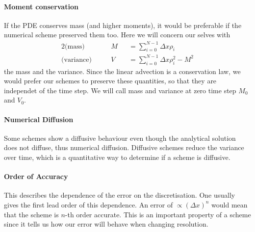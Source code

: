\paragraph{Moment conservation}
If the PDE conserves mass (and higher moments), it would be preferable if the numerical scheme preserved them too. Here we will concern our selves with 
\begin{alignat}{2}
\text{(mass)}& \qquad M&&=\sum_{i=0}^{N-1} \Delta x\rho_i \\
\text{(variance)}&\qquad V&&=\sum_{i=0}^{N-1} \Delta x\rho_i ^2- M^2
\end{alignat}
the mass and the variance. Since the linear advection is a conservation law, we would prefer our schemes to preserve these quantities, so that they are independet of the time step.
We will call mass and variance at zero time step $M_0$ and $V_0$.
\paragraph{Numerical Diffusion}
Some schemes show a diffusive behaviour even though the analytical solution does not diffuse, thus numerical diffusion. Diffusive schemes reduce the variance over time, which is a quantitative way to determine if a scheme is diffusive.
\paragraph{Order of Accuracy}
This describes the dependence of the error on the discretisation. One usually gives the first lead order of this dependence. An error of $\propto (\Delta x)^n$ would mean that the scheme is $n$-th order accurate. This is an important property of a scheme since it tells us how our error will behave when changing resolution.
